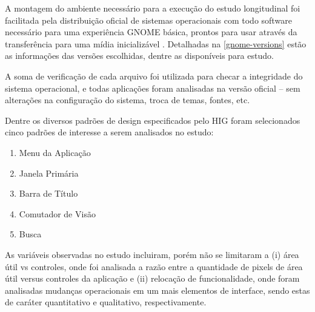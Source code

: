A montagem do ambiente necessário para a execução do estudo longitudinal foi
facilitada pela distribuição oficial de sistemas operacionais com todo software
necessário para uma experiência GNOME básica, prontos para usar através da
transferência para uma mídia inicializável \cite{gnome2015promo-usb}. Detalhadas
na \autoref{gnome-versions} estão as informações das versões escolhidas, dentre
as disponíveis para estudo.

A soma de verificação de cada arquivo foi utilizada para checar a integridade do
sistema operacional, e todas aplicações foram analisadas na versão oficial --
sem alterações na configuração do sistema, troca de temas, fontes, etc.

\begin{table}[htb]
\end{table}

Dentre os diversos padrões de design especificados pelo HIG
\cite{hig314patterns} foram selecionados cinco padrões de interesse a serem
analisados no estudo:

\begin{enumerate}
  \item Menu da Aplicação
  \item Janela Primária
  \item Barra de Título
  \item Comutador de Visão
  \item Busca
\end{enumerate}

As variáveis observadas no estudo incluiram, porém não se limitaram a (i) área
útil vs controles, onde foi analisada a razão entre a quantidade de pixels de
área útil versus controles da aplicação e (ii) relocação de funcionalidade,
onde foram analisadas mudanças operacionais em um mais elementos de interface,
sendo estas de caráter quantitativo e qualitativo, respectivamente.

